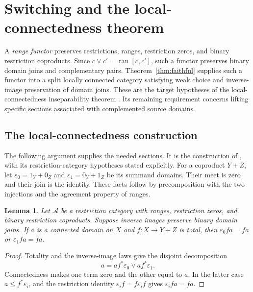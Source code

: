 \documentclass[11pt]{article}
\newtheorem{lemma}[theorem]{Lemma}
\newcommand{\ran}{\operatorname{ran}}
\begin{document}
\section{Switching and the local-connectedness theorem}\label{sec:lifting}

A \emph{range functor} preserves restrictions, ranges, restriction zeros,
and binary restriction coproducts. Since $c\vee c'=\ran[c,c']$,
such a functor preserves binary domain joins and complementary pairs.
Theorem~\ref{thm:faithful} supplies
such a functor into a split locally connected category satisfying weak
choice and inverse-image preservation of domain joins. These are the
target hypotheses of the local-connectedness inseparability theorem
\cite[Theorem 4.7]{LOC}. Its remaining requirement concerns lifting
specific sections associated with complemented source domains.

\subsection{The local-connectedness construction}

The following argument supplies the needed sections. It is the
construction of \cite[Section 4.3]{LOC}, with its restriction-category
hypotheses stated explicitly. For a coproduct $Y+Z$, let
$\varepsilon_0=1_Y+0_Z$ and $\varepsilon_1=0_Y+1_Z$ be its summand
domains. Their meet is zero and their join is the identity. These facts
follow by precomposition with the two injections and the agreement
property of ranges.

\begin{lemma}\label{lem:connected-alternative}
Let $\mathcal A$ be a restriction category with ranges, restriction zeros,
and binary restriction coproducts. Suppose inverse images preserve binary
domain joins. If $a$ is a connected domain on $X$ and
$f:X\to Y+Z$ is total, then
$\varepsilon_0fa=fa$ or $\varepsilon_1fa=fa$.
\end{lemma}
\begin{proof}
Totality and the inverse-image laws give the disjoint decomposition
\[
 a=af^*\varepsilon_0\vee af^*\varepsilon_1.
\]
Connectedness makes one term zero and the other equal to $a$. In the
latter case $a\le f^*\varepsilon_i$, and the restriction identity
$\varepsilon_i f=f\overline{\varepsilon_i f}$ gives
$\varepsilon_i fa=fa$.
\end{proof}
\end{document}
